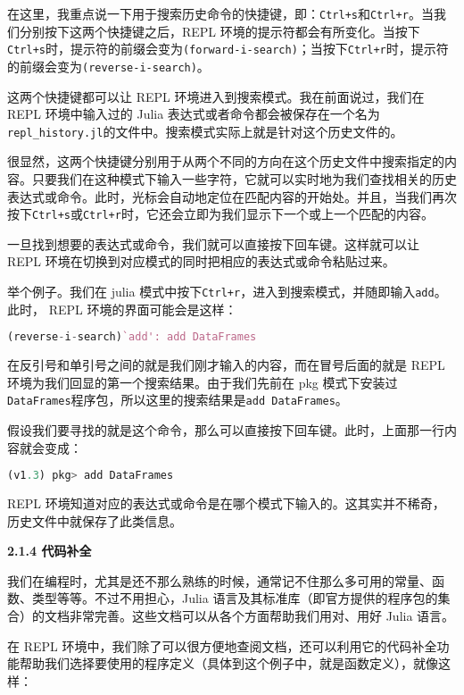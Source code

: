 在这里，我重点说一下用于搜索历史命令的快捷键，即：\verb|Ctrl+s|和\verb|Ctrl+r|。当我们分别按下这两个快捷键之后，REPL 环境的提示符都会有所变化。当按下\verb|Ctrl+s|时，提示符的前缀会变为\verb|(forward-i-search)|；当按下\verb|Ctrl+r|时，提示符的前缀会变为\verb|(reverse-i-search)|。

这两个快捷键都可以让 REPL 环境进入到搜索模式。我在前面说过，我们在 REPL 环境中输入过的 Julia 表达式或者命令都会被保存在一个名为\verb|repl_history.jl|的文件中。搜索模式实际上就是针对这个历史文件的。

很显然，这两个快捷键分别用于从两个不同的方向在这个历史文件中搜索指定的内容。只要我们在这种模式下输入一些字符，它就可以实时地为我们查找相关的历史表达式或命令。此时，光标会自动地定位在匹配内容的开始处。并且，当我们再次按下\verb|Ctrl+s|或\verb|Ctrl+r|时，它还会立即为我们显示下一个或上一个匹配的内容。

一旦找到想要的表达式或命令，我们就可以直接按下回车键。这样就可以让 REPL 环境在切换到对应模式的同时把相应的表达式或命令粘贴过来。

举个例子。我们在 julia 模式中按下\verb|Ctrl+r|，进入到搜索模式，并随即输入\verb|add|。此时， REPL 环境的界面可能会是这样：

\begin{lstlisting}[language=julia]
(reverse-i-search)`add': add DataFrames
\end{lstlisting}

在反引号和单引号之间的就是我们刚才输入的内容，而在冒号后面的就是 REPL 环境为我们回显的第一个搜索结果。由于我们先前在 pkg 模式下安装过\verb|DataFrames|程序包，所以这里的搜索结果是\verb|add DataFrames|。

假设我们要寻找的就是这个命令，那么可以直接按下回车键。此时，上面那一行内容就会变成：

\begin{lstlisting}[language=julia]
(v1.3) pkg> add DataFrames
\end{lstlisting}

REPL 环境知道对应的表达式或命令是在哪个模式下输入的。这其实并不稀奇，历史文件中就保存了此类信息。

\textbf{2.1.4 代码补全}

我们在编程时，尤其是还不那么熟练的时候，通常记不住那么多可用的常量、函数、类型等等。不过不用担心，Julia 语言及其标准库（即官方提供的程序包的集合）的文档非常完善。这些文档可以从各个方面帮助我们用对、用好 Julia 语言。

在 REPL 环境中，我们除了可以很方便地查阅文档，还可以利用它的代码补全功能帮助我们选择要使用的程序定义（具体到这个例子中，就是函数定义），就像这样：

